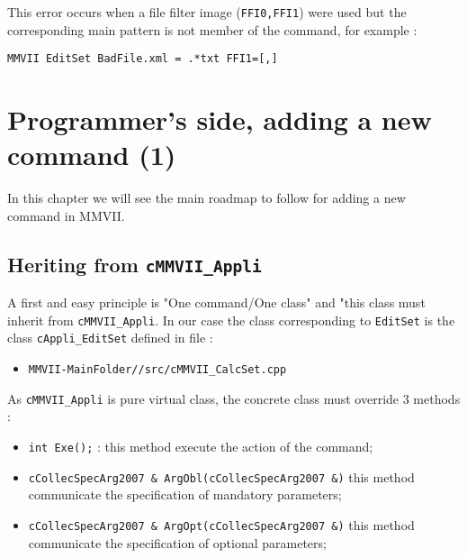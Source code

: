 \documentclass[a4paper]{book}
\newcommand{\PPP}{MMVII}
\newcommand{\MMVIDIR}{{\tt MMVII-MainFolder/}}
\begin{document}
This error occurs when a file filter image ({\tt FFI0,FFI1}) were used but
the corresponding main pattern is not member of the command, for example :

\begin{verbatim}
MMVII EditSet BadFile.xml = .*txt FFI1=[,]
\end{verbatim}



\section{Programmer's side, adding a new command (1)}

In this chapter we will see the main roadmap to follow for
adding a new command in \PPP.



\subsection{Heriting from  {\tt cMMVII\_Appli}}

A first and easy principle is "One command/One class" and  "this class must
inherit from {\tt cMMVII\_Appli}.
In our case the class corresponding to {\tt EditSet} is the class {\tt cAppli\_EditSet}
defined in file :

\begin{itemize}
   \item  {\tt \MMVIDIR/src/cMMVII\_CalcSet.cpp}
\end{itemize}
As {\tt cMMVII\_Appli} is pure virtual class, the concrete class must override
$3$ methods :

\begin{itemize}
   \item {\tt int Exe();} : this method execute the action of the command;

   \item {\tt cCollecSpecArg2007 \& ArgObl(cCollecSpecArg2007 \&)} this method communicate the specification
         of mandatory parameters;

   \item {\tt cCollecSpecArg2007 \& ArgOpt(cCollecSpecArg2007 \&)} this method communicate the specification
         of optional parameters;
\end{itemize}
\end{document}

